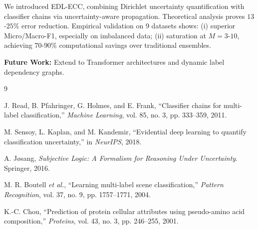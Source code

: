 \documentclass[conference]{IEEEtran}
\begin{document}
We introduced EDL-ECC, combining Dirichlet uncertainty quantification with classifier chains via uncertainty-aware propagation. Theoretical analysis proves $13$-$25\%$ error reduction. Empirical validation on 9 datasets shows: (i) superior Micro/Macro-F1, especially on imbalanced data; (ii) saturation at $M=3$-$10$, achieving $70$-$90\%$ computational savings over traditional ensembles.

\textbf{Future Work:} Extend to Transformer architectures and dynamic label dependency graphs.

\begin{thebibliography}{9}

J. Read, B. Pfahringer, G. Holmes, and E. Frank, ``Classifier chains for multi-label classification,'' \textit{Machine Learning}, vol. 85, no. 3, pp. 333--359, 2011.

M. Sensoy, L. Kaplan, and M. Kandemir, ``Evidential deep learning to quantify classification uncertainty,'' in \textit{NeurIPS}, 2018.

A. Jøsang, \textit{Subjective Logic: A Formalism for Reasoning Under Uncertainty}. Springer, 2016.

M. R. Boutell \textit{et al.}, ``Learning multi-label scene classification,'' \textit{Pattern Recognition}, vol. 37, no. 9, pp. 1757--1771, 2004.

K.-C. Chou, ``Prediction of protein cellular attributes using pseudo-amino acid composition,'' \textit{Proteins}, vol. 43, no. 3, pp. 246--255, 2001.

\end{thebibliography}
\end{document}
